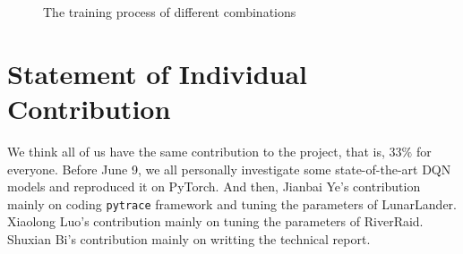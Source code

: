 \documentclass[12pt]{article}
\begin{document}
\begin{appendices}
\begin{figure}[h]
{\begin{minipage}[t]{0.18\linewidth}
\end{minipage}
}%
%
\centering
\caption{\label{fig: diff-model}The training process of different combinations}
\end{figure}

\section{Statement of Individual Contribution}
We think all of us have the same contribution to the project, that is, $33\%$ for everyone. Before June 9, we all personally investigate some state-of-the-art DQN models and reproduced it on PyTorch. And then, Jianbai Ye's contribution mainly on coding \texttt{pytrace} framework and tuning the parameters of LunarLander. Xiaolong Luo's contribution mainly on tuning the parameters of RiverRaid. Shuxian Bi's contribution mainly on writting the technical report.


\end{appendices}

\newpage
  

\end{document}

